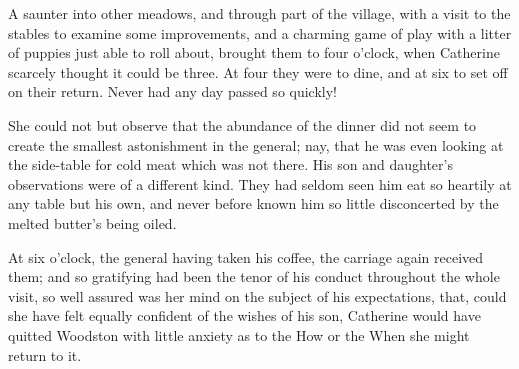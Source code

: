  A saunter into other meadows, and through part of the village, with a visit to the stables to examine some improvements, and a charming game of play with a litter of puppies just able to roll about, brought them to four o'clock, when Catherine scarcely thought it could be three. At four they were to dine, and at six to set off on their return. Never had any day passed so quickly! 

 She could not but observe that the abundance of the dinner did not seem to create the smallest astonishment in the general; nay, that he was even looking at the side-table for cold meat which was not there. His son and daughter's observations were of a different kind. They had seldom seen him eat so heartily at any table but his own, and never before known him so little disconcerted by the melted butter's being oiled. 

 At six o'clock, the general having taken his coffee, the carriage again received them; and so gratifying had been the tenor of his conduct throughout the whole visit, so well assured was her mind on the subject of his expectations, that, could she have felt equally confident of the wishes of his son, Catherine would have quitted Woodston with little anxiety as to the How or the When she might return to it. 